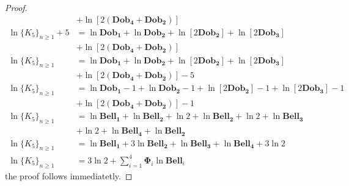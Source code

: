 \documentclass[pdflatex,sn-mathphys-num]{sn-jnl}%
\newtheorem{theorem}{Theorem}
\theoremstyle{thmstyleone}%
\theoremstyle{thmstyletwo}%
\theoremstyle{thmstylethree}%
\begin{document}
\begin{proof}
\begin{align*}
 &+  \ln[2(\mathbf{Dob_4}+ \mathbf{Dob_2})]\\
 \ln \lbrace K_5\rbrace_{n\geq 1} + 5 &= \ln \mathbf{Dob_1}+ \ln \mathbf{Dob_2}+  \ln[2\mathbf{Dob_2}] + \ln[2\mathbf{Dob_3}] \\
 &+  \ln[2(\mathbf{Dob_4}+ \mathbf{Dob_2})]\\
 \ln \lbrace K_5\rbrace_{n\geq 1} &= \ln \mathbf{Dob_1}+ \ln \mathbf{Dob_2}+  \ln[2\mathbf{Dob_2}] + \ln[2\mathbf{Dob_3}] \\
 &+  \ln[2(\mathbf{Dob_4}+ \mathbf{Dob_2})]-5\\
 \ln \lbrace K_5\rbrace_{n\geq 1}&= \ln \mathbf{Dob_1}-1+ \ln \mathbf{Dob_2}-1+  \ln[2\mathbf{Dob_2}]-1 + \ln[2\mathbf{Dob_3}]-1 \\
 &+  \ln[2(\mathbf{Dob_4}+ \mathbf{Dob_2})]-1\\
 \ln \lbrace K_5\rbrace_{n\geq 1}&= \ln{\mathbf{Bell_1}}+ \ln{\mathbf{Bell_2}} +  \ln{2} + \ln{\mathbf{Bell_2}} + \ln{2} + \ln{\mathbf{Bell_3}} \\
 &+  \ln{2} + \ln{\mathbf{Bell_4}}+ \ln{\mathbf{Bell_2}} \\
  \ln \lbrace K_5\rbrace_{n\geq 1}&= \ln{\mathbf{Bell_1}}+ 3\ln{\mathbf{Bell_2}} + \ln{\mathbf{Bell_3}} + \ln{\mathbf{Bell_4}}+3\ln{2}\\
  \ln \lbrace K_5\rbrace_{n\geq 1}&= 3\ln{2}+ \sum_{i=1}^{4} \mathbf{\Phi}_i \ln{\mathbf{Bell}_i}
\end{align*}
the proof follows immediatetly.
\end{proof}

\end{document}
